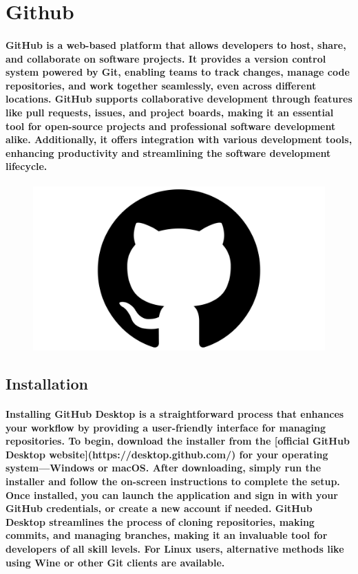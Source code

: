 \documentclass[12pt, a4paper]{article}
\begin{document}
\newpage

\usetikzlibrary{calc}


\section*{Github}
\paragraph{GitHub is a web-based platform that allows developers to host, share, and collaborate on software projects. It provides a version control system powered by Git, enabling teams to track changes, manage code repositories, and work together seamlessly, even across different locations. GitHub supports collaborative development through features like pull requests, issues, and project boards, making it an essential tool for open-source projects and professional software development alike. Additionally, it offers integration with various development tools, enhancing productivity and streamlining the software development lifecycle.}

\begin{figure}
    \centering
    \includegraphics[width=0.5\linewidth]{GitHub-Symbol.png}
\end{figure}
\subsection*{Installation}
\paragraph{Installing GitHub Desktop is a straightforward process that enhances your workflow by providing a user-friendly interface for managing repositories. To begin, download the installer from the [official GitHub Desktop website](https://desktop.github.com/) for your operating system—Windows or macOS. After downloading, simply run the installer and follow the on-screen instructions to complete the setup. Once installed, you can launch the application and sign in with your GitHub credentials, or create a new account if needed. GitHub Desktop streamlines the process of cloning repositories, making commits, and managing branches, making it an invaluable tool for developers of all skill levels. For Linux users, alternative methods like using Wine or other Git clients are available.}
\newpage
\end{document}
